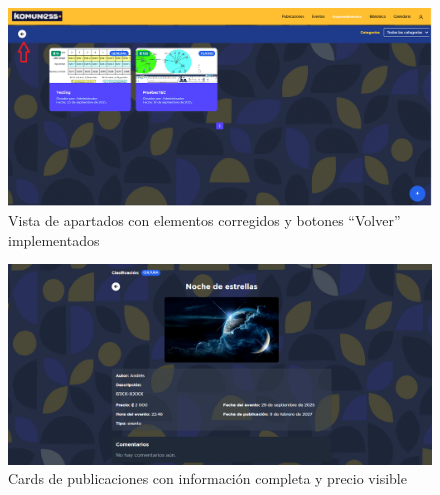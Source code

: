 \begin{figure}[H]
  \centering
  \includegraphics[width=\textwidth]{project/images/6.13.png}
  \caption{Vista de apartados con elementos corregidos y botones ``Volver'' implementados}
  \label{fig:frontend-navegacion}
\end{figure}

\begin{figure}[H]
  \centering
  \includegraphics[width=\textwidth]{project/images/6.15.png}
  \caption{Cards de publicaciones con información completa y precio visible}
  \label{fig:frontend-cards}
\end{figure}
